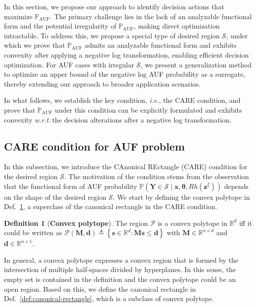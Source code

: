 \documentclass{article}
\theoremstyle{plain}
\theoremstyle{definition}
\newtheorem{definition}[theorem]{Definition}
\def \x {\mathbf{x}}
\def \M {\mathbf{M}}
\def \Y{\mathbf{Y}}
\def \wrt {\textit{w.r.t.}$\ $}
\def \ie {\textit{i.e.}}
\def \x {\mathbf{x}}
\def \sP {\mathcal{P}}
\def \s {\mathbf{s}}
\def \sS {\mathcal{S}}
\def \Y {\mathbf{Y}}
\def \M {\mathbf{M}}
\def \z {\mathbf{z}}
\def \d {\mathbf{d}}
\begin{document}
In this section, we propose our approach to identify decision actions that maximize $\mathbb{P}_{\operatorname{AUF}}$. 
The primary challenge lies in the lack of an analyzable functional form and the potential irregularity of $\mathbb{P}_{\operatorname{AUF}}$, making direct optimization intractable. 
To address this, we propose a special type of desired region $\sS$, under which we prove  that $\mathbb{P}_{\operatorname{AUF}}$ admits an analyzable functional form and exhibits convexity after applying a negative log transformation, enabling efficient decision optimization. 
For AUF cases with irregular $\sS$, we present a generalization method to optimize an upper bound of the negative log AUF probability as a surrogate, thereby extending our approach to broader application scenarios.


In what follows, we establish the key condition, \ie, the CARE condition, and prove that \(\mathbb{P}_{\operatorname{AUF}}\) under this condition can be explicitly formulated and exhibits convexity \wrt the decision alterations after a negative log transformation. 



\subsection{CARE condition for AUF problem}
\label{sec:cr-condition}
In this subsection, we introduce the CAnonical REctangle (CARE) condition for the desired region $\sS$. 
The motivation of the condition stems from the observation that the functional form of AUF probability $\mathbb{P}\left(\Y\in\sS \mid \x, \bm{\theta}, Rh(\z^\xi)\right)$ depends on the shape of the desired region $\sS$. 
We start by defining the convex polytope in Def.~\ref{def:convex-polytope}, a superclass of the canonical rectangle in the CARE condition.

\begin{definition}[\textbf{Convex polytope}]
  \label{def:convex-polytope}
  The region $\sP$ is a convex polytope in $\mathbb{R}^d$ iff it could be written as $\sP\left(\M, \d\right) \triangleq \left\{\s\in\mathbb{R}^d:\M\s\leq\d\right\}$ with $\M\in\mathbb{R}^{n\times d}$ and  $\d \in \mathbb{R}^{n\times 1}$.
\end{definition}
\vspace*{-0.06in}

In general, a convex polytope expresses a convex region that is formed by the intersection of multiple half-spaces divided by hyperplanes. In this sense, the empty set is contained in the definition and the convex polytope could be an open region. Based on this, we define the canonical rectangle in Def.~\ref{def:canonical-rectangle}, which is a subclass of convex polytope.
\end{document}
